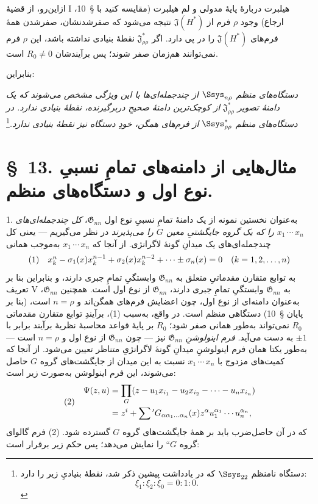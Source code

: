 \documentclass[11pt]{article}
\providecommand{\glqq}{\textquotedblbase}
\providecommand{\grqq}{\textquotedblleft}
\newcommand{\srcLTR}[1]{\relax\ifmmode\text{\mbox{\babelsublr{\foreignlanguage{english}{#1}}}}\else\babelsublr{\foreignlanguage{english}{#1}}\fi}
\newcommand{\srcfn}[2]{\begingroup\renewcommand{\thefootnote}{\srcLTR{#1}}\footnote{#2}\addtocounter{footnote}{-1}\endgroup}
\providecommand{\Jdom}{\mathfrak{J}}
\providecommand{\Gdom}{\mathfrak{G}}
\providecommand{\rcdots}{\,\cdots\,}
\begin{document}
ازاین‌رو، از قضیهٔ I هیلبرت دربارهٔ پایهٔ مدولی و لم هیلبرت (مقایسه کنید با \S\ 10، ارجاع) وجود $\rho$ فرم از $\Jdom(H^*)$ نتیجه می‌شود که صفرشدنشان، صفرشدن همهٔ فرم‌های $\Jdom(H^*)$ را در پی دارد. اگر $\Jdom^*_{\rho\rho}$ نقطهٔ بنیادی نداشته باشد، این $\rho$ فرم نمی‌توانند هم‌زمان صفر شوند؛ پس برآیندشان $R_0\ne0$ است.

بنابراین:

\emph{دستگاه‌های منظم $\Ssys_{n\rho}$ از چندجمله‌ای‌ها با این ویژگی مشخص می‌شوند که یک دامنهٔ تصویر $\Jdom^*_{\rho\rho}$ از کوچک‌ترین دامنهٔ صحیحِ دربرگیرنده، نقطهٔ بنیادی ندارد. در دستگاه‌های منظم $\Ssys^*_{\rho\rho}$ از فرم‌های همگن، خودِ دستگاه نیز نقطهٔ بنیادی ندارد.}\srcfn{*)}{دستگاه نامنظم $\Ssys_{22}$ که در یادداشت پیشین ذکر شد، نقطهٔ بنیادیِ زیر را دارد:
\[
\xi_1:\xi_2:\xi_0=0:1:0.
\]}

\section*{\S\ 13. مثال‌هایی از دامنه‌های تمامِ نسبیِ نوع اول و دستگاه‌های منظم.}

1. به‌عنوان نخستین نمونه از یک دامنهٔ تمامِ نسبیِ نوع اول $\Gdom_{nn}$، \emph{کل چندجمله‌ای‌های $x_1\rcdots x_n$ را که یک گروه جایگشتیِ معین $G$ را می‌پذیرند} در نظر می‌گیریم --- یعنی کل چندجمله‌ای‌های یک میدانِ گونهٔ لاگرانژی. از آنجا که $x_1\rcdots x_n$ به‌موجب همانی
\[
\begin{array}{@{}l@{\quad}c@{}}
(1)& x_k^n-\sigma_1(x)x_k^{n-1}+\sigma_2(x)x_k^{n-2}+\cdots\pm\sigma_n(x)=0\quad(k=1,2,\ldots,n)
\end{array}
\]
به توابع متقارن مقدماتیِ متعلق به $\Gdom_{nn}$ وابستگیِ تمامِ جبری دارند، و بنابراین بنا بر تعریف V به $\Gdom_{nn}$ وابستگیِ تمامِ جبری دارند، $\Gdom_{nn}$ از نوع اول است. همچنین $\Gdom_{nn}$، به‌عنوان دامنه‌ای از نوع اول، چون اعضایش فرم‌های همگن‌اند و $n=\rho$ است، (بنا بر پایان \S\ 10) دستگاهی منظم است. در واقع، به‌سبب (1)، برآیندِ توابع متقارن مقدماتی $R_0$ نمی‌تواند به‌طور همانی صفر شود؛ $R_0$ بر پایهٔ قواعد محاسبهٔ نظریهٔ برآیند برابر با $\pm1$ به دست می‌آید. \emph{فرم اینولوشنِ} $\Gdom_{nn}$ نیز --- چون $\Gdom_{nn}$ از نوع اول و $n=\rho$ است --- به‌طور یکتا همان فرم اینولوشنِ میدانِ گونهٔ لاگرانژیِ متناظر تعیین می‌شود. از آنجا که کمیت‌های مزدوج با $x_1\rcdots x_n$ نسبت به این میدان از جایگشت‌های گروه $G$ حاصل می‌شوند، این فرم اینولوشن به‌صورت زیر است:
\[
\begin{array}{@{}l@{\quad}c@{}}
(2)&
\begin{aligned}
  \Psi(z,u)&=\prod_G
  (z-u_1x_{i_1}-u_2x_{i_2}-\cdots-u_nx_{i_n})\\
  &=z^i+\sum{}'G_{\alpha\alpha_1\ldots\alpha_n}(x)
  z^\alpha u_1^{\alpha_1}\cdots u_n^{\alpha_n},
\end{aligned}
\end{array}
\]
که در آن حاصل‌ضرب باید بر همهٔ جایگشت‌های گروه $G$ گسترده شود. (2) \glqq{}فرم گالوای گروه $G$\grqq{} را نمایش می‌دهد؛ پس حکم زیر برقرار است:
\end{document}
